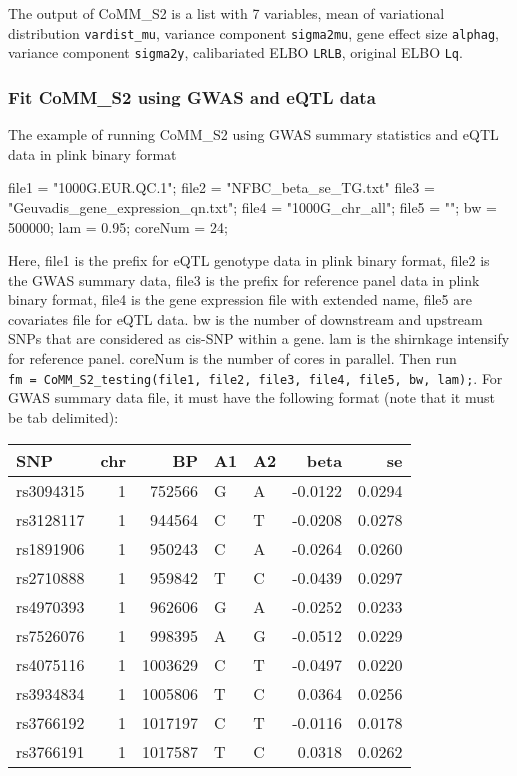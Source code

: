 \documentclass[]{article}
\newenvironment{Shaded}{\begin{snugshade}}{\end{snugshade}}
\newcommand{\DecValTok}[1]{\textcolor[rgb]{0.00,0.00,0.81}{#1}}
\newcommand{\FloatTok}[1]{\textcolor[rgb]{0.00,0.00,0.81}{#1}}
\newcommand{\StringTok}[1]{\textcolor[rgb]{0.31,0.60,0.02}{#1}}
\newcommand{\NormalTok}[1]{#1}
\begin{document}
The output of CoMM\_S2 is a list with 7 variables, mean of variational
distribution \texttt{vardist\_mu}, variance component \texttt{sigma2mu},
gene effect size \texttt{alphag}, variance component \texttt{sigma2y},
calibariated ELBO \texttt{LRLB}, original ELBO \texttt{Lq}.

\subsubsection{Fit CoMM\_S2 using GWAS and eQTL
data}\label{fit-comm_s2-using-gwas-and-eqtl-data}

The example of running CoMM\_S2 using GWAS summary statistics and eQTL
data in plink binary format

\begin{Shaded}
\begin{Highlighting}[]
\NormalTok{file1 =}\StringTok{ "1000G.EUR.QC.1"}\NormalTok{;}
\NormalTok{file2 =}\StringTok{ "NFBC_beta_se_TG.txt"}
\NormalTok{file3 =}\StringTok{ "Geuvadis_gene_expression_qn.txt"}\NormalTok{;}
\NormalTok{file4 =}\StringTok{ "1000G_chr_all"}\NormalTok{;}
\NormalTok{file5 =}\StringTok{ ""}\NormalTok{;}
\NormalTok{bw =}\StringTok{ }\DecValTok{500000}\NormalTok{;}
\NormalTok{lam =}\StringTok{ }\FloatTok{0.95}\NormalTok{;}
\NormalTok{coreNum =}\StringTok{ }\DecValTok{24}\NormalTok{;}
\end{Highlighting}
\end{Shaded}

Here, file1 is the prefix for eQTL genotype data in plink binary format,
file2 is the GWAS summary data, file3 is the prefix for reference panel
data in plink binary format, file4 is the gene expression file with
extended name, file5 are covariates file for eQTL data. bw is the number
of downstream and upstream SNPs that are considered as cis-SNP within a
gene. lam is the shirnkage intensify for reference panel. coreNum is the
number of cores in parallel. Then run
\texttt{fm\ =\ CoMM\_S2\_testing(file1,\ file2,\ file3,\ file4,\ file5,\ bw,\ lam);}.
For GWAS summary data file, it must have the following format (note that
it must be tab delimited):

\begin{longtable}[]{@{}lrrllrr@{}}
\toprule
SNP & chr & BP & A1 & A2 & beta & se\tabularnewline
\midrule
\endhead
rs3094315 & 1 & 752566 & G & A & -0.0122 & 0.0294\tabularnewline
rs3128117 & 1 & 944564 & C & T & -0.0208 & 0.0278\tabularnewline
rs1891906 & 1 & 950243 & C & A & -0.0264 & 0.0260\tabularnewline
rs2710888 & 1 & 959842 & T & C & -0.0439 & 0.0297\tabularnewline
rs4970393 & 1 & 962606 & G & A & -0.0252 & 0.0233\tabularnewline
rs7526076 & 1 & 998395 & A & G & -0.0512 & 0.0229\tabularnewline
rs4075116 & 1 & 1003629 & C & T & -0.0497 & 0.0220\tabularnewline
rs3934834 & 1 & 1005806 & T & C & 0.0364 & 0.0256\tabularnewline
rs3766192 & 1 & 1017197 & C & T & -0.0116 & 0.0178\tabularnewline
rs3766191 & 1 & 1017587 & T & C & 0.0318 & 0.0262\tabularnewline
\bottomrule
\end{longtable}
\end{document}
